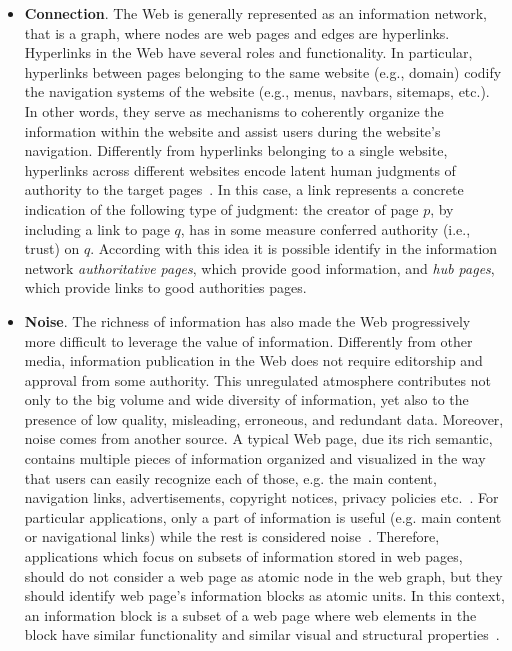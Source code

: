 \begin{itemize}
\item \textbf{Connection}. The Web is generally represented as an information network, that is a graph, where nodes are web pages and edges are hyperlinks. Hyperlinks in the Web have several roles and functionality. In particular, hyperlinks between pages belonging to the same website (e.g., domain) codify the navigation systems of the website (e.g., menus, navbars, sitemaps, etc.). In other words, they serve as mechanisms to coherently organize the information within the website and assist users during the website's navigation. Differently from hyperlinks belonging to a single website, hyperlinks across different websites encode latent human judgments of authority to the target pages~\cite{Levene:2010}. In this case, a link represents a concrete indication of the following type of judgment: the creator of page $p$, by including a link to page $q$, has in some measure conferred authority (i.e., trust) on $q$. According with this idea it is possible identify in the information network \emph{authoritative pages}, which provide good information, and \emph{hub pages}, which provide links to good
authorities pages. %
 
\item \textbf{Noise}. 
The richness of information has also made the Web progressively more difficult to leverage the value of information. Differently from other media, information publication in the Web does not require editorship and approval from some authority. 
This unregulated atmosphere contributes not only to the big volume and wide diversity of information, yet also to the presence of low quality, misleading, erroneous, and redundant data.
Moreover, noise comes from another source. A typical Web page, due its rich semantic, contains multiple pieces of information organized and visualized in the way that users can easily recognize each of those, e.g. the main content, navigation
links, advertisements, copyright notices, privacy policies etc.~\cite{Keller:2012}. For particular applications, only a part of information is useful (e.g. main content or navigational links) while the rest is considered noise~\cite{Yi:2003, Liu:2006, Keller:2012}. Therefore, applications which focus on subsets of information stored in web pages, should do not consider a web page as atomic node in the web graph, but they should identify web page's information blocks as atomic units. In this context, an information block is a subset of a web page where web elements in the block have similar functionality and similar visual and structural properties~\cite{Lin:2011}. 


\end{itemize}
